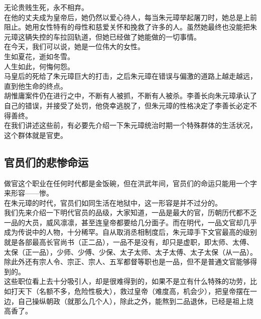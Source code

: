 \begin{multicols}{\theparacolNo}
无论贵贱生死，永不相弃。\\

在他的丈夫成为皇帝后，她仍然以爱心待人，每当朱元璋举起屠刀时，她总是上前阻止。她用女性特有的母性和慈爱关怀和挽救了许多的人。虽然她最终也没能把朱元璋这辆失控的车拉回轨道，但她已经做了她能做的一切事情。\\

在今天，我们可以说，她是一位伟大的女性。\\

生如夏花，逝如冬雪。\\

人生如此，何悔何怨。\\

马皇后的死给了朱元璋巨大的打击，之后朱元璋在错误与偏激的道路上越走越远，直到他生命的终点。\\

胡惟庸案件仍在进行之中，不断有人被抓，不断有人被杀。李善长向朱元璋承认了自己的错误，并接受了处罚，他侥幸逃脱了，但朱元璋的性格决定了李善长必定不得善终。\\

在我们讲述这些前，有必要先介绍一下朱元璋统治时期一个特殊群体的生活状况，这个群体就是官吏。\\

\subsection{官员们的悲惨命运}
做官这个职业在任何时代都是金饭碗，但在洪武年间，官员们的命运只能用一个字来形容——惨。\\

在朱元璋的时代，官员们如同生活在地狱中，这一形容是并不过分的。\\

我们先来介绍一下明代官员的品级，大家知道，一品是最大的官，历朝历代都不乏一品的大员，威风凛凛，甚至连皇帝都要给几分面子。而在明代，一品文官却几乎成为传说中的人物，十分稀罕。自从取消丞相制度后，朱元璋手下文官最高的级别就是各部最高长官尚书（正二品），一品不是没有，却只是虚职，即太师、太傅、太保（正一品），少师、少傅、少保、太子太师、太子太傅、太子太保（从一品）。除此外还有宗人令、宗正、宗人、五军都督等职也是一品，但不是普通文官能够得到的。\\

这些职位看上去十分吸引人，却是很难得到的，如果不是立有什么特殊的功劳，比如打天下（名额不多，危险性极大），救过皇帝（难度高，机会少），把皇帝摆在一边，自己操纵朝政（就那么几个人），除此之外，能熬到二品退休，已经是祖上烧高香了。\\


\end{multicols}
